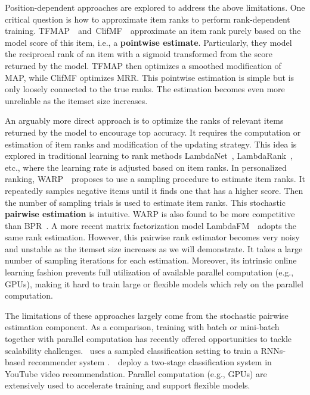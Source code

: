 \documentclass[letterpaper]{article} %
\begin{document}
Position-dependent approaches are explored to address the above limitations. One critical question is how to approximate item ranks to perform rank-dependent training. TFMAP~\cite{shi2012tfmap}~and~ClifMF~\cite{shi2012climf}~approximate an item rank purely based on the model score of this item, i.e., a \textbf{pointwise estimate}. Particularly, they model the reciprocal rank of an item with a sigmoid transformed from the score returned by the model. TFMAP then optimizes a smoothed modification of MAP, while ClifMF optimizes MRR. This pointwise estimation is simple but is only loosely connected to the true ranks. The estimation becomes even more unreliable as the itemset size increases.

An arguably more direct approach is to optimize the ranks of relevant items returned by the model to encourage top accuracy. It requires the computation or estimation of item ranks and modification of the updating strategy. This idea is explored in traditional learning to rank methods LambdaNet~\cite{burges2005learning}, LambdaRank~\cite{burges2007learning}, etc., where the learning rate is adjusted based on item ranks. In personalized ranking, WARP~\cite{weston2010large}~proposes to use a sampling procedure to estimate item ranks. It repeatedly samples negative items until it finds one that has a higher score. Then the number of sampling trials is used to estimate item ranks. This stochastic \textbf{pairwise estimation} is intuitive. WARP is also found to be more competitive than BPR~\cite{hong2013co}. A more recent matrix factorization model LambdaFM~\cite{yuan2016lambdafm}~adopts the same rank estimation. However, this pairwise rank estimator becomes very noisy and unstable as the itemset size increases as we will demonstrate. It takes a large number of sampling iterations for each estimation. Moreover, its intrinsic online learning fashion prevents full utilization of available parallel computation (e.g., GPUs), making it hard to train large or flexible models which rely on the parallel computation.

The limitations of these approaches largely come from the stochastic pairwise estimation component. As a comparison, training with batch or mini-batch together with parallel computation has recently offered opportunities to tackle scalability challenges. \cite{hidasi2015session}~uses a sampled classification setting to train a RNNs-based recommender system .~\cite{covington2016deep}~deploy a two-stage classification system in YouTube video recommendation. Parallel computation (e.g., GPUs) are extensively used to accelerate training and support flexible models.%
\end{document}
